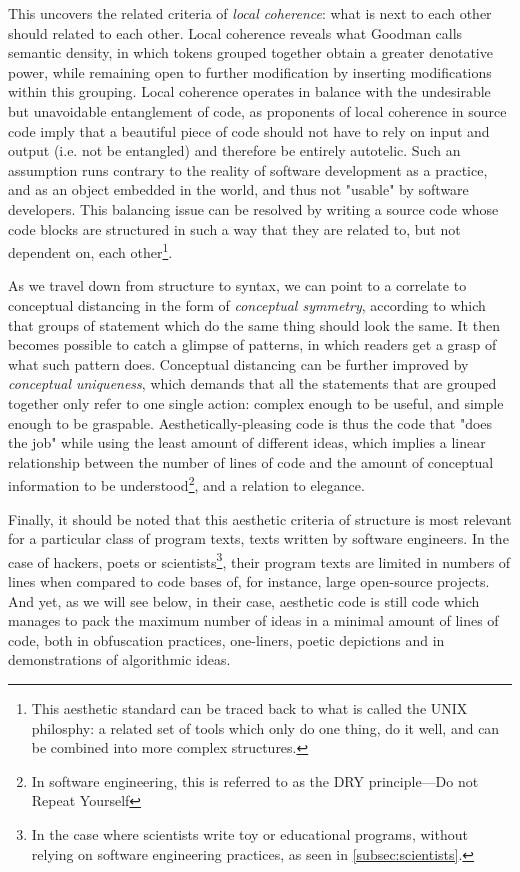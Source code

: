 This uncovers the related criteria of \emph{local coherence}: what is next to each other should related to each other. Local coherence reveals what Goodman calls semantic density, in which tokens grouped together obtain a greater denotative power, while remaining open to further modification by inserting modifications within this grouping. Local coherence operates in balance with the undesirable but unavoidable entanglement of code, as proponents of local coherence in source code imply that a beautiful piece of code should not have to rely on input and output (i.e. not be entangled) and therefore be entirely autotelic. Such an assumption runs contrary to the reality of software development as a practice, and as an object embedded in the world, and thus not "usable" by software developers. This balancing issue can be resolved by writing a source code whose code blocks are structured in such a way that they are related to, but not dependent on, each other\footnote{This aesthetic standard can be traced back to what is called the UNIX philosphy: a related set of tools which only do one thing, do it well, and can be combined into more complex structures.}.

As we travel down from structure to syntax, we can point to a correlate to conceptual distancing in the form of \emph{conceptual symmetry}, according to which that groups of statement which do the same thing should look the same. It then becomes possible to catch a glimpse of patterns, in which readers get a grasp of what such pattern does. Conceptual distancing can be further improved by \emph{conceptual uniqueness}, which demands that all the statements that are grouped together only refer to one single action: complex enough to be useful, and simple enough to be graspable. Aesthetically-pleasing code is thus the code that "does the job" while using the least amount of different ideas, which implies a linear relationship between the number of lines of code and the amount of conceptual information to be understood\footnote{In software engineering, this is referred to as the DRY principle—Do not Repeat Yourself\citep{martin_clean_2008}}, and a relation to elegance.

Finally, it should be noted that this aesthetic criteria of structure is most relevant for a particular class of program texts, texts written by software engineers. In the case of hackers, poets or scientists\footnote{In the case where scientists write toy or educational programs, without relying on software engineering practices, as seen in \ref{subsec:scientists}.}, their program texts are limited in numbers of lines when compared to code bases of, for instance, large open-source projects. And yet, as we will see below, in their case, aesthetic code is still code which manages to pack the maximum number of ideas in a minimal amount of lines of code, both in obfuscation practices, one-liners, poetic depictions and in demonstrations of algorithmic ideas.

